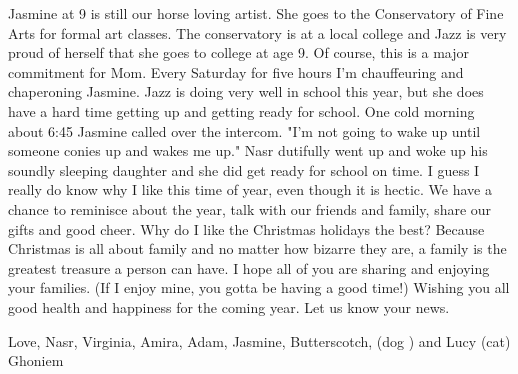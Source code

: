 Jasmine at 9 is still our horse loving artist.  She goes to the Conservatory of Fine Arts for formal art classes. The conservatory is at a local
college and Jazz is very proud of herself that she goes to college at age 9. Of course, this is a major commitment for Mom. Every Saturday for
five hours I'm chauffeuring and chaperoning Jasmine. Jazz is doing very well in school this year, but she does have a hard time getting up and
getting ready for school. One cold morning about 6:45 Jasmine called over the intercom. "I'm not going to wake up until someone conies up and
wakes me up."   Nasr dutifully went up and woke up his soundly sleeping daughter and she did get ready for school on time. I guess I really do
know why I like this time of year, even though it is hectic. We have a chance to reminisce about the year, talk with our friends and family,
share our gifts and good cheer. Why do I like the Christmas holidays the best?   Because Christmas is all about family and no matter how bizarre
they are, a family is the greatest treasure a person can have. I hope all of you are sharing and enjoying your families. (If I enjoy mine, you
gotta be having a good time!) Wishing you all good health and happiness for the coming year.   Let us know your news.

Love, Nasr, Virginia, Amira, Adam, Jasmine, Butterscotch, (dog ) and Lucy (cat) Ghoniem




%
